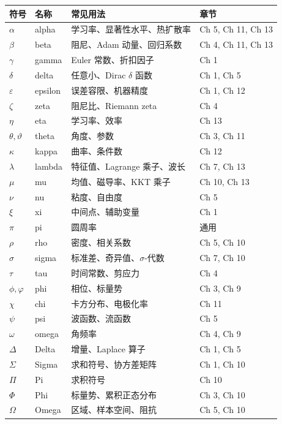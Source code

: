 \begin{center}
\renewcommand{\arraystretch}{1.2}
\begin{tabular}{@{}llll@{}}
\toprule
\textbf{符号} & \textbf{名称} & \textbf{常见用法} & \textbf{章节} \\
\midrule
$\alpha$ & alpha & 学习率、显著性水平、热扩散率 & Ch 5, Ch 11, Ch 13 \\
$\beta$ & beta & 阻尼、Adam 动量、回归系数 & Ch 4, Ch 11, Ch 13 \\
$\gamma$ & gamma & Euler 常数、折扣因子 & Ch 1 \\
$\delta$ & delta & 任意小、Dirac $\delta$ 函数 & Ch 1, Ch 5 \\
$\varepsilon$ & epsilon & 误差容限、机器精度 & Ch 1, Ch 12 \\
$\zeta$ & zeta & 阻尼比、Riemann zeta & Ch 4 \\
$\eta$ & eta & 学习率、效率 & Ch 13 \\
$\theta, \vartheta$ & theta & 角度、参数 & Ch 3, Ch 11 \\
$\kappa$ & kappa & 曲率、条件数 & Ch 12 \\
$\lambda$ & lambda & 特征值、Lagrange 乘子、波长 & Ch 7, Ch 13 \\
$\mu$ & mu & 均值、磁导率、KKT 乘子 & Ch 10, Ch 13 \\
$\nu$ & nu & 粘度、自由度 & Ch 5 \\
$\xi$ & xi & 中间点、辅助变量 & Ch 1 \\
$\pi$ & pi & 圆周率 & 通用 \\
$\rho$ & rho & 密度、相关系数 & Ch 5, Ch 10 \\
$\sigma$ & sigma & 标准差、奇异值、$\sigma$-代数 & Ch 7, Ch 10 \\
$\tau$ & tau & 时间常数、剪应力 & Ch 4 \\
$\phi, \varphi$ & phi & 相位、标量势 & Ch 3, Ch 9 \\
$\chi$ & chi & 卡方分布、电极化率 & Ch 11 \\
$\psi$ & psi & 波函数、流函数 & Ch 5 \\
$\omega$ & omega & 角频率 & Ch 4, Ch 9 \\
$\Delta$ & Delta & 增量、Laplace 算子 & Ch 1, Ch 5 \\
$\Sigma$ & Sigma & 求和符号、协方差矩阵 & Ch 1, Ch 10 \\
$\Pi$ & Pi & 求积符号 & Ch 10 \\
$\Phi$ & Phi & 标量势、累积正态分布 & Ch 3, Ch 10 \\
$\Omega$ & Omega & 区域、样本空间、阻抗 & Ch 5, Ch 10 \\
\bottomrule
\end{tabular}
\end{center}

